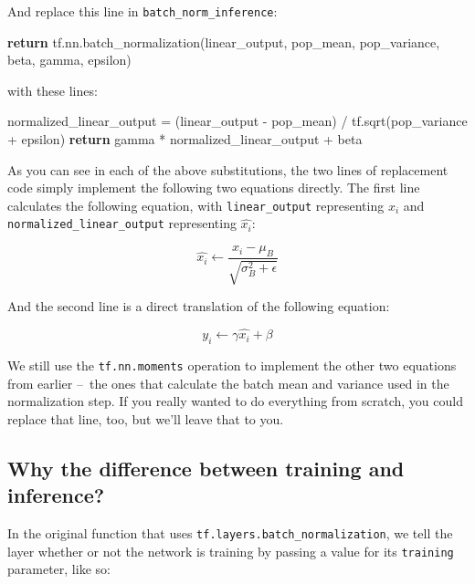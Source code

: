\documentclass[11pt]{article}
\newenvironment{Shaded}{}{}
\newcommand{\NormalTok}[1]{{#1}}
\newcommand{\ControlFlowTok}[1]{\textcolor[rgb]{0.00,0.44,0.13}{\textbf{{#1}}}}
\newcommand{\OperatorTok}[1]{\textcolor[rgb]{0.40,0.40,0.40}{{#1}}}
\begin{document}
And replace this line in \texttt{batch\_norm\_inference}:

\begin{Shaded}
\begin{Highlighting}[]
\ControlFlowTok{return}\NormalTok{ tf.nn.batch_normalization(linear_output, pop_mean, pop_variance, beta, gamma, epsilon)}
\end{Highlighting}
\end{Shaded}

with these lines:

\begin{Shaded}
\begin{Highlighting}[]
\NormalTok{normalized_linear_output }\OperatorTok{=}\NormalTok{ (linear_output }\OperatorTok{-}\NormalTok{ pop_mean) }\OperatorTok{/}\NormalTok{ tf.sqrt(pop_variance }\OperatorTok{+}\NormalTok{ epsilon)}
\ControlFlowTok{return}\NormalTok{ gamma }\OperatorTok{*}\NormalTok{ normalized_linear_output }\OperatorTok{+}\NormalTok{ beta}
\end{Highlighting}
\end{Shaded}

As you can see in each of the above substitutions, the two lines of
replacement code simply implement the following two equations directly.
The first line calculates the following equation, with
\texttt{linear\_output} representing \(x_i\) and
\texttt{normalized\_linear\_output} representing \(\hat{x_i}\):

\[
\hat{x_i} \leftarrow \frac{x_i - \mu_B}{\sqrt{\sigma_{B}^{2} + \epsilon}}
\]

And the second line is a direct translation of the following equation:

\[
y_i \leftarrow \gamma \hat{x_i} + \beta
\]

We still use the \texttt{tf.nn.moments} operation to implement the other
two equations from earlier --~the ones that calculate the batch mean and
variance used in the normalization step. If you really wanted to do
everything from scratch, you could replace that line, too, but we'll
leave that to you.

\hypertarget{why-the-difference-between-training-and-inference}{%
\subsection{Why the difference between training and
inference?}\label{why-the-difference-between-training-and-inference}}

In the original function that uses
\texttt{tf.layers.batch\_normalization}, we tell the layer whether or
not the network is training by passing a value for its \texttt{training}
parameter, like so:
\end{document}

